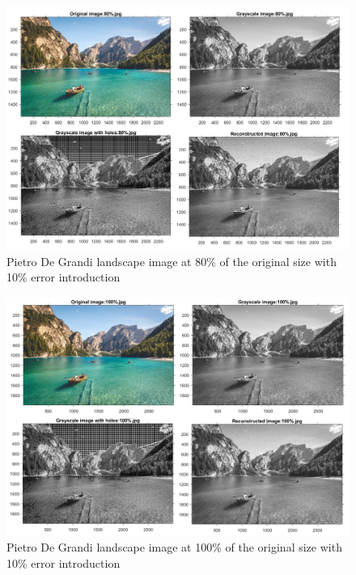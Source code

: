 \begin{figure}[!ht]
\center \includegraphics[scale=0.31]{PietroDeGrandi80.jpg}
\caption{Pietro De Grandi landscape image at 80\% of the original size with 10\% error introduction}
\label{fig:PietroDeGrandi80}
\end{figure}

\begin{figure}[!ht]
\center \includegraphics[scale=0.31]{PietroDeGrandi100.jpg}
\caption{Pietro De Grandi landscape image at 100\% of the original size with 10\% error introduction}
\label{fig:PietroDeGrandi100}
\end{figure}


